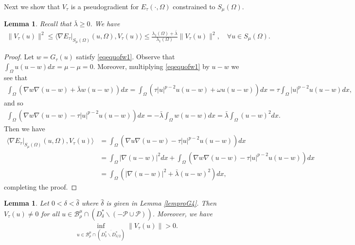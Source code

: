 \documentclass[10pt,a4paper]{article}
\newtheorem{lemma}[theorem]{Lemma}
\theoremstyle{definition} \theoremstyle{remark}
\numberwithin{equation}{section}
\newcommand{\B}{\mathcal{B}}
\newcommand{\p}{\mathcal{P}}
\newcommand{\la}{\lambda}
\begin{document}
Next we show that $V_\tau$ is a pseudogradient for $E_\tau(\cdot,\Omega)$ constrained to $S_\mu(\Omega)$.

\begin{lemma} \label{lempseudogradient}
	Recall that $\bar \la \geq 0$. We have
	\begin{align*}
		\|V_\tau(u)\|^2 \leq \langle \nabla E_\tau|_{S_\mu(\Omega)}(u,\Omega), V_\tau(u) \rangle \leq \frac{\la_1(\Omega) + \bar\la}{\la_1(\Omega)} \|V_\tau(u)\|^2, \quad \forall u \in S_\mu(\Omega).
	\end{align*}
\end{lemma}

\begin{proof}
	Let $w = G_\tau(u)$ satisfy \eqref{eqequofw1}. Observe that $\int_\Omega u(u-w)dx = \mu - \mu = 0$. Moreover, multiplying \eqref{eqequofw1} by $u-w$ we see that
	\begin{align*}
		\int_\Omega \left( \nabla w \nabla (u-w) + \bar \la w (u-w)\right) dx = \int_\Omega \left( \tau|u|^{p-2}u(u-w) + \omega u(u-w) \right) dx = \tau\int_\Omega |u|^{p-2}u(u-w)dx,
	\end{align*}
	and so
	\begin{align*}
		\int_\Omega \left( \nabla w \nabla (u-w) - \tau|u|^{p-2}u(u-w)\right) dx = - \bar \la \int_\Omega w(u-w)dx = \bar \la \int_\Omega (u-w)^2dx.
	\end{align*}
	Then we have
	\begin{align*}
		\langle \nabla E_\tau|_{S_\mu(\Omega)}(u,\Omega), V_\tau(u) \rangle & = \int_\Omega\left( \nabla u \nabla (u-w) - \tau|u|^{p-2}u(u-w) \right)dx \\
		& = \int_\Omega|\nabla (u-w)|^2dx + \int_\Omega\left( \nabla w \nabla (u-w) - \tau|u|^{p-2}u(u-w) \right)dx \\
		& = \int_\Omega\left( |\nabla (u-w)|^2 + \bar \la (u-w)^2 \right) dx,
	\end{align*}
    completing the proof.
\end{proof}


\begin{lemma} \label{leminf>0}
	Let $0 < \delta < \hat\delta$ where $\hat \delta$ is given in Lemma \ref{lemproG4}. Then $V_\tau(u) \neq 0$ for all $u \in \B_\rho^\mu \cap (D_\delta^*\backslash (-\p \cup \p))$. Moreover, we have
	\begin{align} \label{eqinf>0}
		\inf_{u \in \B_\rho^\mu \cap (\overline{D_\delta^*\backslash D_{\delta/2}^*})}\|V_\tau(u)\| > 0.
	\end{align}
\end{lemma}
\end{document}
